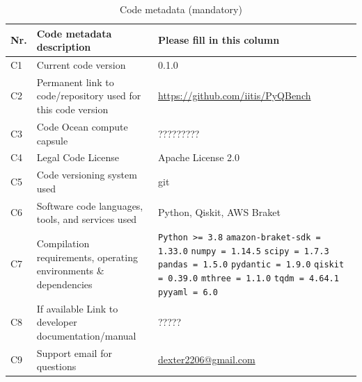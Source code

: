 \documentclass[preprint,12pt, a4paper]{elsarticle}
\newcommand{\1}{{\rm 1\hspace{-0.9mm}l}}
\newcommand{\textapprox}{\raisebox{0.5ex}{\texttildelow}}
\begin{document}
\begin{table}[H]
\begin{tabular}{|l|p{6.5cm}|p{6.5cm}|}
\hline
\textbf{Nr.} & \textbf{Code metadata description} & \textbf{Please fill in this 
column} \\
\hline
C1 & Current code version & 0.1.0 \\
\hline
C2 & Permanent link to code/repository used for this code version & \url{https://github.com/iitis/PyQBench} \\
\hline
C3 & Code Ocean compute capsule & ?????????\\
\hline
C4 & Legal Code License & Apache License 2.0\\
\hline
C5 & Code versioning system used & git \\
\hline
C6 & Software code languages, tools, and services used & Python, Qiskit, AWS Braket \\
\hline
C7 & Compilation requirements, operating environments \& dependencies & 
\texttt{Python >= 3.8}\newline
\texttt{amazon-braket-sdk \textapprox= 1.33.0}\newline
\texttt{numpy \textapprox= 1.14.5}\newline
\texttt{scipy \textapprox= 1.7.3}\newline
\texttt{pandas \textapprox= 1.5.0}\newline
\texttt{pydantic \textapprox= 1.9.0}\newline
\texttt{qiskit \textapprox= 0.39.0}\newline
\texttt{mthree \textapprox= 1.1.0}\newline
\texttt{tqdm \textapprox= 4.64.1}\newline
\texttt{pyyaml \textapprox= 6.0}\\
\hline
C8 & If available Link to developer documentation/manual & ?????\\
\hline
C9 & Support email for questions & \url{dexter2206@gmail.com}\\
\hline
\end{tabular}
\caption{Code metadata (mandatory)}
\label{} 
\end{table}


\linenumbers


%
%
%
%
\end{document}

